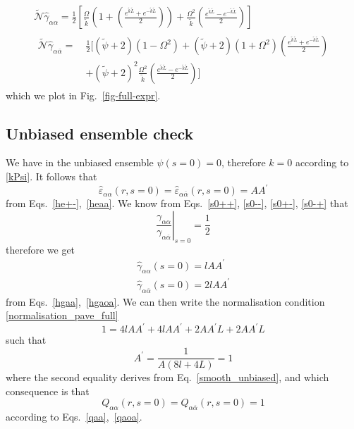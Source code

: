\documentclass[pre,aps,superscriptaddress,nofootinbib]{revtex4}
\begin{document}
\begin{eqnarray}
\tilde{\mathcal{N}} \hat{\gamma}_{\alpha\alpha} = \frac{1}{2} \left[\frac{\Omega}{\tilde{k}} \left(1 + \left(\frac{e^{\tilde{k} \tilde{L}} + e^{-\tilde{k} \tilde{L}}}{2}\right)\right) + \frac{\Omega^2}{\tilde{k}} \left(\frac{e^{\tilde{k} \tilde{L}} - e^{-\tilde{k} \tilde{L}}}{2}\right)\right]\\
\begin{aligned}
\tilde{\mathcal{N}} \hat{\gamma}_{\alpha\overline{\alpha}} =~& \frac{1}{2} \Bigg[(\tilde{\psi} + 2)(1 - \Omega^2) + (\tilde{\psi} + 2)(1 + \Omega^2)\left(\frac{e^{\tilde{k} \tilde{L}} + e^{-\tilde{k} \tilde{L}}}{2}\right)\\
&+ (\tilde{\psi} + 2)^2 \frac{\Omega^2}{\tilde{k}} \left(\frac{e^{\tilde{k} \tilde{L}} - e^{-\tilde{k} \tilde{L}}}{2}\right)\Bigg]
\end{aligned}
\end{eqnarray}
which we plot in Fig.~\ref{fig-full-expr}.

\subsection{Unbiased ensemble check}

We have in the unbiased ensemble $\psi(s = 0) = 0$, therefore $k = 0$ according to \eqref{kPsi}. It follows that
\begin{equation}
\hat{\varepsilon}_{\alpha\alpha}(r, s=0) = \hat{\varepsilon}_{\alpha\overline{\alpha}}(r, s=0) = A A^{\prime}
\end{equation}
from Eqs.~\ref{he+-},~\ref{heaa}. We know from Eqs.~\ref{s0++}, \ref{s0--}, \ref{s0+-}, \ref{s0-+} that
\begin{equation}
\left. \frac{\gamma_{\alpha\alpha}}{\gamma_{\alpha\overline{\alpha}}} \right|_{s=0} = \frac{1}{2}
\end{equation}
therefore we get
\begin{eqnarray}
\hat{\gamma}_{\alpha\alpha}(s=0) = l A A^{\prime}\\
\hat{\gamma}_{\alpha\overline{\alpha}}(s=0) = 2 l A A^{\prime}
\end{eqnarray}
from Eqs.~\ref{hgaa},~\ref{hgaoa}. We can then write the normalisation condition \eqref{normalisation_pave_full}
\begin{equation}
1 = 4 l A A^{\prime} + 4 l A A^{\prime} + 2 A A^{\prime} L + 2 A A^{\prime} L
\end{equation}
such that
\begin{equation}
A^{\prime} = \frac{1}{A( 8 l + 4 L)} = 1
\end{equation}
where the second equality derives from Eq.~\ref{smooth_unbiased}, and which consequence is that
\begin{equation}
Q_{\alpha\alpha}(r, s=0) = Q_{\alpha\overline{\alpha}}(r, s=0) = 1
\end{equation}
according to Eqs.~\ref{qaa},~\ref{qaoa}.



{\renewcommand{\bibname}{References}}
\end{document}
